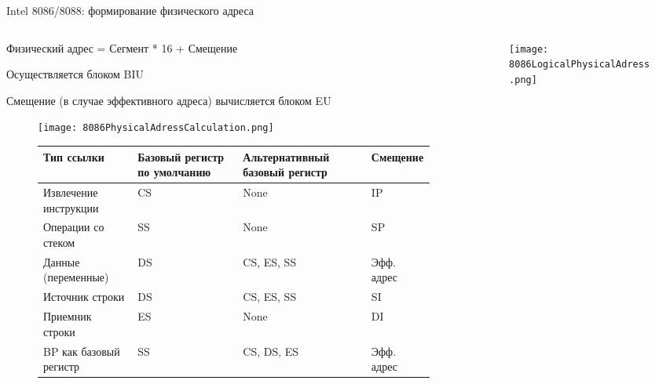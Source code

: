\documentclass[aspectratio=169,14pt]{beamer}
\begin{document}
\begin{frame}{Intel 8086/8088: формирование физического адреса}
    \begin{columns}[t,onlytextwidth]
        \begin{column}{0.7\textwidth}
            \begin{itemize}
                \begin{footnotesize}
                \begin{spacing}{0.8}
                \item Физический адрес = Сегмент * 16 + Смещение
                \item Осуществляется блоком BIU
                \item Смещение (в случае эффективного адреса) вычисляется блоком EU
                \end{spacing}
                \end{footnotesize}
                \begin{figure}[h]
                    \centering
                    \texttt{[image: 8086PhysicalAdressCalculation.png]}
                    \begin{tiny}
                    \begin{tabular}{|p{2.2cm}|p{1.8cm}|p{1.8cm}|p{1.2cm}|}
                        \hline
                        \textbf{Тип ссылки} & \textbf{Базовый регистр по умолчанию} & \textbf{Альтернативный базовый регистр} & \textbf{Смещение} \\ \hline
                        Извлечение инструкции & CS & None & IP \\ \hline
                        Операции со стеком & SS & None & SP \\ \hline
                        Данные (переменные) & DS & CS, ES, SS & Эфф. адрес \\ \hline
                        Источник строки & DS & CS, ES, SS & SI \\ \hline
                        Приемник строки & ES & None & DI \\ \hline
                        BP как базовый регистр & SS & CS, DS, ES & Эфф. адрес \\ \hline
                    \end{tabular}
                    \end{tiny}
                \end{figure}
            \end{itemize}
        \end{column}
        \begin{column}{0.3\textwidth}
            \begin{figure}[h]
                \centering
                \texttt{[image: 8086LogicalPhysicalAdress.png]}
            \end{figure}
        \end{column}
    \end{columns}
\end{frame}
\end{document}
